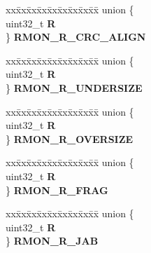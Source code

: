 \begin{DoxyCompactItemize}
\begin{tabbing}
\end{tabbing}\item 
\mbox{\label{structFEC__tag_a69f00704d44b53c5b4ff600388ac2c2c}} 
\begin{tabbing}
xx\=xx\=xx\=xx\=xx\=xx\=xx\=xx\=xx\=\kill
union \{\\
\>uint32\_t {\bfseries R}\\
\} {\bfseries RMON\_R\_CRC\_ALIGN}\\

\end{tabbing}\item 
\mbox{\label{structFEC__tag_ae339c4f13dcd8169092bbf7773605146}} 
\begin{tabbing}
xx\=xx\=xx\=xx\=xx\=xx\=xx\=xx\=xx\=\kill
union \{\\
\>uint32\_t {\bfseries R}\\
\} {\bfseries RMON\_R\_UNDERSIZE}\\

\end{tabbing}\item 
\mbox{\label{structFEC__tag_a493ceb6ccd245615cb663c2695c2de1d}} 
\begin{tabbing}
xx\=xx\=xx\=xx\=xx\=xx\=xx\=xx\=xx\=\kill
union \{\\
\>uint32\_t {\bfseries R}\\
\} {\bfseries RMON\_R\_OVERSIZE}\\

\end{tabbing}\item 
\mbox{\label{structFEC__tag_aeff0bb091ad2b2225d49b56e074e60ce}} 
\begin{tabbing}
xx\=xx\=xx\=xx\=xx\=xx\=xx\=xx\=xx\=\kill
union \{\\
\>uint32\_t {\bfseries R}\\
\} {\bfseries RMON\_R\_FRAG}\\

\end{tabbing}\item 
\mbox{\label{structFEC__tag_a469b42a0930f7c9a33dffd8cc6f15c50}} 
\begin{tabbing}
xx\=xx\=xx\=xx\=xx\=xx\=xx\=xx\=xx\=\kill
union \{\\
\>uint32\_t {\bfseries R}\\
\} {\bfseries RMON\_R\_JAB}\\


\end{tabbing}
\end{DoxyCompactItemize}
